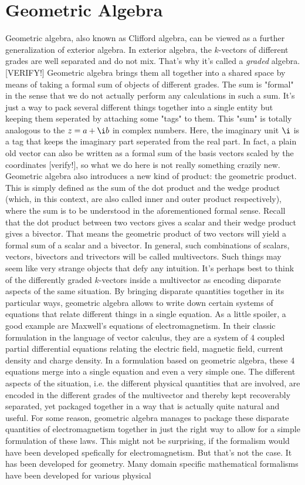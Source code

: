 \section{Geometric Algebra}
Geometric algebra, also known as Clifford algebra, can be viewed as a further generalization of exterior algebra. In exterior algebra, the $k$-vectors of different grades are well separated and do not mix. That's why it's called a \emph{graded} algebra. [VERIFY!] Geometric algebra brings them all together into a shared space by means of taking a formal sum of objects of different grades. The sum is "formal" in the sense that we do not actually perform any calculations in such a sum. It's just a way to pack several different things together into a single entity but keeping them seperated by attaching some "tags" to them. This "sum" is totally analogous to the $z = a + \i b$ in complex numbers. Here, the imaginary unit $\i$ is a tag that keeps the imaginary part seperated from the real part. In fact, a plain old vector can also be written as a formal sum of the basis vectors scaled by the coordinates [verify!], so what we do here is not really something crazily new. Geometric algebra also introduces a new kind of product: the geometric product. This is simply defined as the sum of the dot product and the wedge product (which, in this context, are also called inner and outer product respectively), where the sum is to be understood in the aforementioned formal sense. Recall that the dot product between two vectors gives a scalar and their wedge product gives a bivector. That means the geometric product of two vectors will yield a formal sum of a scalar and a bivector. In general, such combinations of scalars, vectors, bivectors and trivectors will be called multivectors. Such things may seem like very strange objects that defy any intuition. It's perhaps best to think of the differently graded $k$-vectors inside a multivector as encoding disparate aspects of the same situation. By bringing disparate quantities together in its particular ways, geometric algebra allows to write down certain systems of equations that relate different things in a single equation. As a little spoiler, a good example are Maxwell's equations of electromagnetism. In their classic formulation in the language of vector calculus, they are a system of 4 coupled partial differential equations relating the electric field, magnetic field, current density and charge density. In a formulation based on geometric algebra, these 4 equations merge into a single equation and even a very simple one. The different aspects of the situation, i.e. the different physical quantities that are involved, are encoded in the different grades of the multivector and thereby kept recoverably separated, yet packaged together in a way that is actually quite natural and useful. For some reason, geometric algebra manages to package these disparate quantities of electromagnetism together in just the right way to allow for a simple formulation of these laws. This might not be surprising, if the formalism would have been developed spefically for electromagnetism. But that's not the case. It has been developed for geometry. Many domain specific mathematical formalisms have been developed for various physical 